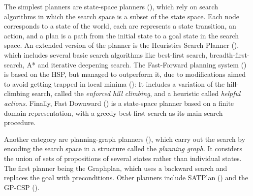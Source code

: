The simplest planners are state-space planners (\cite{ghallab2004automated}), which rely on search algorithms in which the search space is a subset of the state space. 
Each node corresponds to a state of the world, each arc represents a state transition, \ie an action, and a plan is a path from the initial state to a goal state in the search space. 
An extended version of the planner is the Heuristics Search Planner (\cite{bonet:01}), which includes several basic search algorithms like best-first search, breadth-first-search, A* and iterative deepening search. 
The Fast-Forward planning system (\cite{hoffmann:11}) is based on the HSP, but managed to outperform it, due to modifications aimed to avoid getting trapped in local minima (\cite{hoffmann2000heuristic}): 
It includes a variation of the hill-climbing search, called the \textit{enforced hill climbing}, and a heuristic called \textit{helpful actions}. 
Finally, Fast Downward (\cite{helmert:06a}) is a state-space planner based on a finite domain representation, with a greedy best-first search as its main search procedure. 

Another category are planning-graph planners (\cite{blum:97}), which carry out the search by encoding the search space in a structure called the \textit{planning graph}. 
It considers the union of sets of propositions of several states rather than individual states. 
The first planner being the Graphplan, which uses a backward search and replaces the goal with preconditions. 
Other planners include SATPlan (\cite{kautz:06,kautz:99}) and the GP-CSP (\cite{do:01}).

